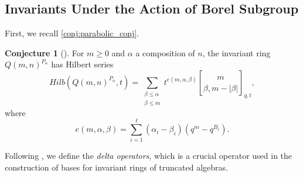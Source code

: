 \documentclass[12pt,a4paper]{report}
\theoremstyle{definition}
\newtheorem{conjecture}[theorem]{Conjecture}
\theoremstyle{remark}
\theoremstyle{definition}
\begin{document}
\subsection{Invariants Under the Action of Borel Subgroup}
First, we recall \cref{conj:parabolic_conj}. 
\begingroup
\def\thetheorem{\ref{conj:parabolic_conj}}
\begin{conjecture}[{\cite[Parabolic conjecture 1.5]{Lewis_Reiner_Stanton_2017}}]
    For $m\geq 0$ and $\alpha$ a composition of $n$, the invariant ring $Q(m, n)^{P_{\alpha}}$ has Hilbert series
    \begin{equation*}
        Hilb(Q(m, n)^{P_{\alpha}}, t) = \sum\limits_{\substack{\beta\leq \alpha\\ \beta\leq m}}t^{e(m, \alpha, \beta)}\genfrac{[}{]}{0pt}{}{m}{\beta, m-|\beta|}_{q, t},
    \end{equation*}
    where 
    \begin{equation*}
        e(m, \alpha, \beta) = \sum\limits_{i=1}^{\ell}(\alpha_i - \beta_i)(q^m-q^{B_i}).
    \end{equation*}
\end{conjecture}
\addtocounter{theorem}{-1}
\endgroup
Following \cite{Ha_Hai_Nghia_2024, ha_hai_nghia_GL, ha_hai_nghia_parabolic_for_low_rank}, we define the \emph{delta operators}, which is a crucial operator used in the construction of bases for invariant rings of truncated algebras.
\end{document}
